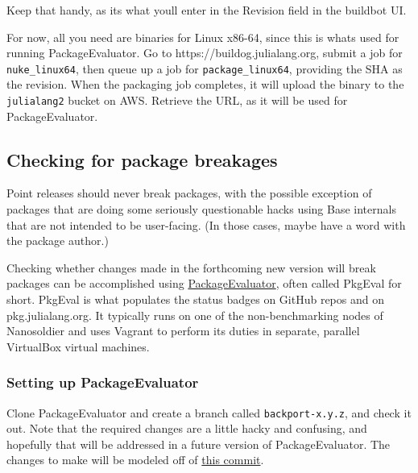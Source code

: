 Keep that handy, as it{\textquotesingle}s what you{\textquotesingle}ll enter in the {\textquotedbl}Revision{\textquotedbl} field in the buildbot UI.



For now, all you need are binaries for Linux x86-64, since this is what{\textquotesingle}s used for running PackageEvaluator. Go to https://buildog.julialang.org, submit a job for \texttt{nuke\_linux64}, then queue up a job for \texttt{package\_linux64}, providing the SHA as the revision. When the packaging job completes, it will upload the binary to the \texttt{julialang2} bucket on AWS. Retrieve the URL, as it will be used for PackageEvaluator.



\hypertarget{18088580952798281058}{}


\subsection{Checking for package breakages}



Point releases should never break packages, with the possible exception of packages that are doing some seriously questionable hacks using Base internals that are not intended to be user-facing. (In those cases, maybe have a word with the package author.)



Checking whether changes made in the forthcoming new version will break packages can be accomplished using \href{https://github.com/JuliaCI/PackageEvaluator.jl}{PackageEvaluator}, often called {\textquotedbl}PkgEval{\textquotedbl} for short. PkgEval is what populates the status badges on GitHub repos and on pkg.julialang.org. It typically runs on one of the non-benchmarking nodes of Nanosoldier and uses Vagrant to perform its duties in separate, parallel VirtualBox virtual machines.



\hypertarget{8830711245206929156}{}


\subsubsection{Setting up PackageEvaluator}



Clone PackageEvaluator and create a branch called \texttt{backport-x.y.z}, and check it out. Note that the required changes are a little hacky and confusing, and hopefully that will be addressed in a future version of PackageEvaluator. The changes to make will be modeled off of \href{https://github.com/JuliaCI/PackageEvaluator.jl/commit/5ba6a3b000e7a3793391d16f695c8704b91d6016}{this commit}.



